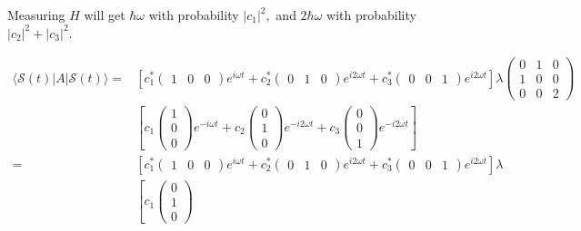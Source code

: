\begin{enumerate}
    Measuring $H$ will get $\hbar\omega$ with probability $|c_1|^2,$ and $2\hbar\omega$ with probability $|c_2|^2+|c_3|^2.$

    \begin{align*}
        \langle \mathcal{S}(t)|A|\mathcal{S}(t)\rangle
        =& 
        \left[
         c_1^*
    \begin{pmatrix}
        1&0&0
    \end{pmatrix}
    e^{i\omega t}
    +
    c_2^*
    \begin{pmatrix}
        0&1&0
    \end{pmatrix}
    e^{i2\omega t}
    +
    c_3^*
    \begin{pmatrix}
        0&0&1
    \end{pmatrix}
    e^{i2\omega t}
    \right]
    \lambda
    \begin{pmatrix}
        0 & 1 & 0\\
        1 & 0 & 0\\
        0 & 0 & 2
    \end{pmatrix}\\
    &\left[
    c_1
    \begin{pmatrix}
        1\\0\\0
    \end{pmatrix}
    e^{-i\omega t}
    +
    c_2
    \begin{pmatrix}
        0\\1\\0
    \end{pmatrix}
    e^{-i2\omega t}
    +
    c_3
    \begin{pmatrix}
        0\\0\\1
    \end{pmatrix}
    e^{-i2\omega t}
    \right]\\
    =&
    \left[
         c_1^*
    \begin{pmatrix}
        1&0&0
    \end{pmatrix}
    e^{i\omega t}
    +
    c_2^*
    \begin{pmatrix}
        0&1&0
    \end{pmatrix}
    e^{i2\omega t}
    +
    c_3^*
    \begin{pmatrix}
        0&0&1
    \end{pmatrix}
    e^{i2\omega t}
    \right]
    \lambda
    \\
    &\left[
    c_1
    \begin{pmatrix}
        0\\1\\0

\end{pmatrix}
\end{align*}
\end{enumerate}
